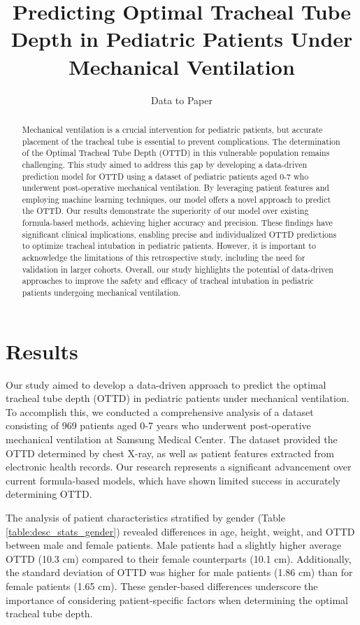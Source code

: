 \documentclass[11pt]{article}
\title{Predicting Optimal Tracheal Tube Depth in Pediatric Patients Under Mechanical Ventilation}
\author{Data to Paper}
\begin{document}
\maketitle
\begin{abstract}
Mechanical ventilation is a crucial intervention for pediatric patients, but accurate placement of the tracheal tube is essential to prevent complications. The determination of the Optimal Tracheal Tube Depth (OTTD) in this vulnerable population remains challenging. This study aimed to address this gap by developing a data-driven prediction model for OTTD using a dataset of pediatric patients aged 0-7 who underwent post-operative mechanical ventilation. By leveraging patient features and employing machine learning techniques, our model offers a novel approach to predict the OTTD. Our results demonstrate the superiority of our model over existing formula-based methods, achieving higher accuracy and precision. These findings have significant clinical implications, enabling precise and individualized OTTD predictions to optimize tracheal intubation in pediatric patients. However, it is important to acknowledge the limitations of this retrospective study, including the need for validation in larger cohorts. Overall, our study highlights the potential of data-driven approaches to improve the safety and efficacy of tracheal intubation in pediatric patients undergoing mechanical ventilation.
\end{abstract}
\section*{Results}

Our study aimed to develop a data-driven approach to predict the optimal tracheal tube depth (OTTD) in pediatric patients under mechanical ventilation. To accomplish this, we conducted a comprehensive analysis of a dataset consisting of 969 patients aged 0-7 years who underwent post-operative mechanical ventilation at Samsung Medical Center. The dataset provided the OTTD determined by chest X-ray, as well as patient features extracted from electronic health records. Our research represents a significant advancement over current formula-based models, which have shown limited success in accurately determining OTTD.

The analysis of patient characteristics stratified by gender (Table \ref{table:desc_stats_gender}) revealed differences in age, height, weight, and OTTD between male and female patients. Male patients had a slightly higher average OTTD (10.3 cm) compared to their female counterparts (10.1 cm). Additionally, the standard deviation of OTTD was higher for male patients (1.86 cm) than for female patients (1.65 cm). These gender-based differences underscore the importance of considering patient-specific factors when determining the optimal tracheal tube depth.
\end{document}
